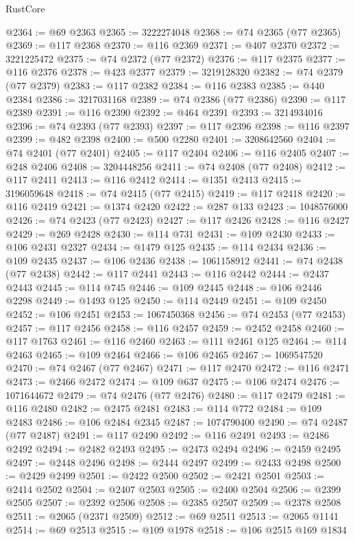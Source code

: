 \begin{lexlean}{RustCore}
\begin{coremodule}
@2364 := @69 @2363
@2365 := 3222274048
@2368 := @74 @2365 (@77 @2365)
@2369 := @117 @2368
@2370 := @116 @2369
@2371 := @407 @2370
@2372 := 3221225472
@2375 := @74 @2372 (@77 @2372)
@2376 := @117 @2375
@2377 := @116 @2376
@2378 := @423 @2377
@2379 := 3219128320
@2382 := @74 @2379 (@77 @2379)
@2383 := @117 @2382
@2384 := @116 @2383
@2385 := @440 @2384
@2386 := 3217031168
@2389 := @74 @2386 (@77 @2386)
@2390 := @117 @2389
@2391 := @116 @2390
@2392 := @464 @2391
@2393 := 3214934016
@2396 := @74 @2393 (@77 @2393)
@2397 := @117 @2396
@2398 := @116 @2397
@2399 := @482 @2398
@2400 := @500 @2280
@2401 := 3208642560
@2404 := @74 @2401 (@77 @2401)
@2405 := @117 @2404
@2406 := @116 @2405
@2407 := @248 @2406
@2408 := 3204448256
@2411 := @74 @2408 (@77 @2408)
@2412 := @117 @2411
@2413 := @116 @2412
@2414 := @1351 @2413
@2415 := 3196059648
@2418 := @74 @2415 (@77 @2415)
@2419 := @117 @2418
@2420 := @116 @2419
@2421 := @1374 @2420
@2422 := @287 @133
@2423 := 1048576000
@2426 := @74 @2423 (@77 @2423)
@2427 := @117 @2426
@2428 := @116 @2427
@2429 := @269 @2428
@2430 := @114 @731
@2431 := @109 @2430
@2433 := @106 @2431 @2327
@2434 := @1479 @125
@2435 := @114 @2434
@2436 := @109 @2435
@2437 := @106 @2436
@2438 := 1061158912
@2441 := @74 @2438 (@77 @2438)
@2442 := @117 @2441
@2443 := @116 @2442
@2444 := @2437 @2443
@2445 := @114 @745
@2446 := @109 @2445
@2448 := @106 @2446 @2298
@2449 := @1493 @125
@2450 := @114 @2449
@2451 := @109 @2450
@2452 := @106 @2451
@2453 := 1067450368
@2456 := @74 @2453 (@77 @2453)
@2457 := @117 @2456
@2458 := @116 @2457
@2459 := @2452 @2458
@2460 := @117 @1763
@2461 := @116 @2460
@2463 := @111 @2461 @125
@2464 := @114 @2463
@2465 := @109 @2464
@2466 := @106 @2465
@2467 := 1069547520
@2470 := @74 @2467 (@77 @2467)
@2471 := @117 @2470
@2472 := @116 @2471
@2473 := @2466 @2472
@2474 := @109 @637
@2475 := @106 @2474
@2476 := 1071644672
@2479 := @74 @2476 (@77 @2476)
@2480 := @117 @2479
@2481 := @116 @2480
@2482 := @2475 @2481
@2483 := @114 @772
@2484 := @109 @2483
@2486 := @106 @2484 @2345
@2487 := 1074790400
@2490 := @74 @2487 (@77 @2487)
@2491 := @117 @2490
@2492 := @116 @2491
@2493 := @2486 @2492
@2494 := @2482 @2493
@2495 := @2473 @2494
@2496 := @2459 @2495
@2497 := @2448 @2496
@2498 := @2444 @2497
@2499 := @2433 @2498
@2500 := @2429 @2499
@2501 := @2422 @2500
@2502 := @2421 @2501
@2503 := @2414 @2502
@2504 := @2407 @2503
@2505 := @2400 @2504
@2506 := @2399 @2505
@2507 := @2392 @2506
@2508 := @2385 @2507
@2509 := @2378 @2508
@2511 := @2065 (@2371 @2509)
@2512 := @69 @2511
@2513 := @2065 @1141
@2514 := @69 @2513
@2515 := @109 @1978
@2518 := @106 @2515 @169 @1834

\end{coremodule}
\end{lexlean}
